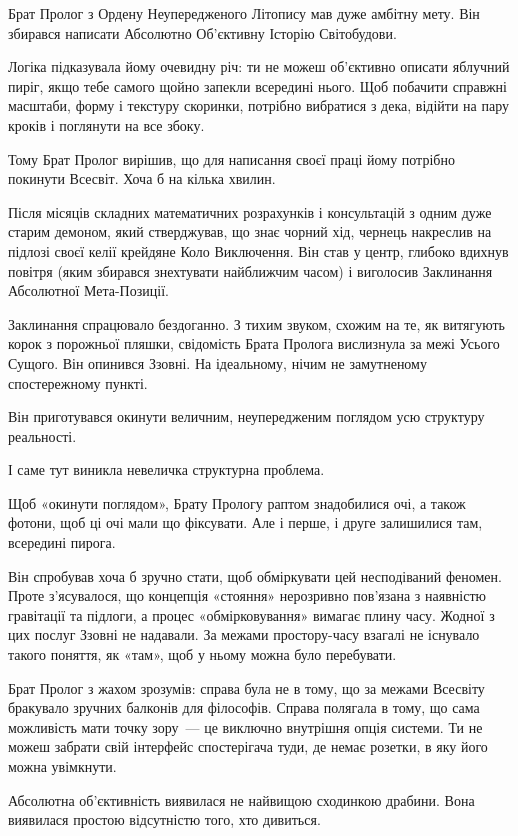 \documentclass[12pt, a4paper, openany]{book}
\begin{document}
\begin{terrybox}
Брат Пролог з Ордену Неупередженого Літопису мав дуже амбітну мету. Він збирався написати Абсолютно Об'єктивну Історію Світобудови.

Логіка підказувала йому очевидну річ: ти не можеш об'єктивно описати яблучний пиріг, якщо тебе самого щойно запекли всередині нього. Щоб побачити справжні масштаби, форму і текстуру скоринки, потрібно вибратися з дека, відійти на пару кроків і поглянути на все збоку.

Тому Брат Пролог вирішив, що для написання своєї праці йому потрібно покинути Всесвіт. Хоча б на кілька хвилин.

Після місяців складних математичних розрахунків і консультацій з одним дуже старим демоном, який стверджував, що знає чорний хід, чернець накреслив на підлозі своєї келії крейдяне Коло Виключення. Він став у центр, глибоко вдихнув повітря (яким збирався знехтувати найближчим часом) і виголосив Заклинання Абсолютної Мета-Позиції.

Заклинання спрацювало бездоганно. З тихим звуком, схожим на те, як витягують корок з порожньої пляшки, свідомість Брата Пролога вислизнула за межі Усього Сущого. Він опинився Ззовні. На ідеальному, нічим не замутненому спостережному пункті.

Він приготувався окинути величним, неупередженим поглядом усю структуру реальності.

І саме тут виникла невеличка структурна проблема.

Щоб «окинути поглядом», Брату Прологу раптом знадобилися очі, а також фотони, щоб ці очі мали що фіксувати. Але і перше, і друге залишилися там, всередині пирога.

Він спробував хоча б зручно стати, щоб обміркувати цей несподіваний феномен. Проте з'ясувалося, що концепція «стояння» нерозривно пов'язана з наявністю гравітації та підлоги, а процес «обмірковування» вимагає плину часу. Жодної з цих послуг Ззовні не надавали. За межами простору-часу взагалі не існувало такого поняття, як «там», щоб у ньому можна було перебувати.

Брат Пролог з жахом зрозумів: справа була не в тому, що за межами Всесвіту бракувало зручних балконів для філософів. Справа полягала в тому, що сама можливість мати точку зору~--- це виключно внутрішня опція системи. Ти не можеш забрати свій інтерфейс спостерігача туди, де немає розетки, в яку його можна увімкнути.

Абсолютна об'єктивність виявилася не найвищою сходинкою драбини. Вона виявилася простою відсутністю того, хто дивиться.


\end{terrybox}
\end{document}
